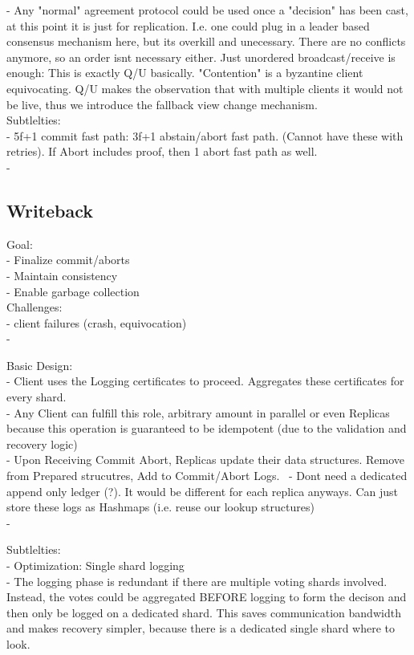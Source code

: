 - Any "normal" agreement protocol could be used once a "decision" has been cast, at this point it is just for replication. I.e. one could plug in a leader based consensus mechanism here, but its overkill and unecessary. There are no conflicts anymore, so an order isnt necessary either. Just unordered broadcast/receive is enough: This is exactly Q/U basically. "Contention" is a byzantine client equivocating. Q/U makes the observation that with multiple clients it would not be live, thus we introduce the fallback view change mechanism. \\

Subtlelties:\\
- 5f+1 commit fast path: 3f+1 abstain/abort fast path. (Cannot have these with retries). If Abort includes proof, then 1 abort fast path as well.\\
- 


\subsection{Writeback}
Goal: \\
- Finalize commit/aborts\\
- Maintain consistency\\
- Enable garbage collection\\

Challenges:\\
- client failures (crash, equivocation)\\
- 

Basic Design:\\
- Client uses the Logging certificates to proceed. Aggregates these certificates for every shard.\\
- Any Client can fulfill this role, arbitrary amount in parallel or even Replicas because this operation is guaranteed to be idempotent (due to the validation and recovery logic)\\
- Upon Receiving Commit Abort, Replicas update their data structures. Remove from Prepared strucutres, Add to Commit/Abort Logs. \
- Dont need a dedicated append only ledger (?). It would be different for each replica anyways. Can just store these logs as Hashmaps (i.e. reuse our lookup structures)\\
- 

Subtlelties:\\
- Optimization: Single shard logging\\
- The logging phase is redundant if there are multiple voting shards involved. Instead, the votes could be aggregated BEFORE logging to form the decison and then only be logged on a dedicated shard. This saves communication bandwidth and makes recovery simpler, because there is a dedicated single shard where to look.\\

